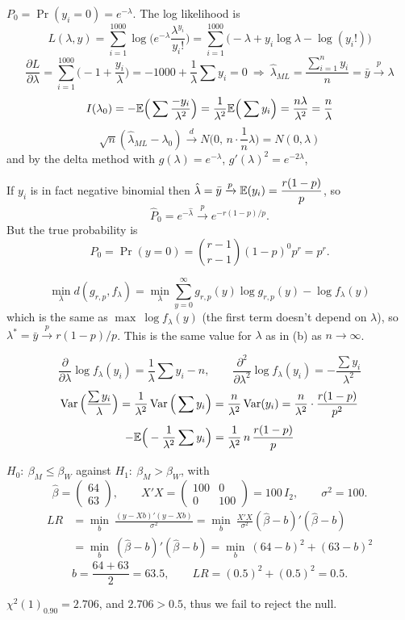 \documentclass[11pt]{article}
\begin{document}
$P_0=\Pr(y_i=0)=e^{-\lambda}$. The log likelihood is
\[
L(\lambda,y)=\sum_{i=1}^{1000}\log\Big(e^{-\lambda}\frac{\lambda^{y_i}}{y_i!}\Big)=\sum_{i=1}^{1000}\big(-\lambda+y_i\log\lambda-\log(y_i!)\big)
\]
\[
\frac{\partial L}{\partial\lambda}=\sum_{i=1}^{1000}\Big(-1+\frac{y_i}\lambda\Big)=-1000+\frac1\lambda\sum y_i=0
\ \Rightarrow\
\hat\lambda_{ML}=\frac{\sum_{i=1}^ny_i}{n}=\bar y\xrightarrow{p}\lambda
\]
\[
I(\lambda_0)=-\mathbb{E}\Big(\sum\frac{-y_i}{\lambda^2}\Big)=\frac1{\lambda^2}\mathbb{E}\Big(\sum y_i\Big)=\frac{n\lambda}{\lambda^2}=\frac n\lambda
\]
\[
\sqrt n(\hat\lambda_{ML}-\lambda_0)\xrightarrow{d}N\Big(0,\,n\cdot\frac1n\lambda\Big)=N(0,\lambda)
\]
and by the delta method with $g(\lambda)=e^{-\lambda}$, $g'(\lambda)^2=e^{-2\lambda}$,

If $y_i$ is in fact negative binomial then $\hat\lambda=\bar y\xrightarrow{p}\mathbb{E}(y_i)=\dfrac{r(1-p)}p$, so
\[
\hat P_0=e^{-\hat\lambda}\xrightarrow{p}e^{-r(1-p)/p}.
\]
But the true probability is
\[
P_0=\Pr(y=0)=\binom{r-1}{r-1}(1-p)^0p^r=p^r .
\]

\[
\min_\lambda d(g_{r,p},f_\lambda)=\min_\lambda\sum_{y=0}^\infty g_{r,p}(y)\log g_{r,p}(y)-\log f_\lambda(y)
\]
which is the same as $\max\ \log f_\lambda(y)$ (the first term doesn't depend on $\lambda$), so $\lambda^*=\bar y\xrightarrow{p}r(1-p)/p$. This is the same value for $\lambda$ as in (b) as $n\to\infty$.

\[
\frac{\partial}{\partial\lambda}\log f_\lambda(y_i)=\frac1\lambda\sum y_i-n,\qquad
\frac{\partial^2}{\partial\lambda^2}\log f_\lambda(y_i)=-\frac{\sum y_i}{\lambda^2}
\]
\[
\operatorname{Var}\Big(\frac{\sum y_i}\lambda\Big)=\frac1{\lambda^2}\operatorname{Var}\Big(\sum y_i\Big)=\frac n{\lambda^2}\operatorname{Var}(y_i)=\frac n{\lambda^2}\cdot\frac{r(1-p)}{p^2}
\]
\[
-\mathbb{E}\Big(-\frac1{\lambda^2}\sum y_i\Big)=\frac1{\lambda^2}\,n\,\frac{r(1-p)}p
\]

\newpage
{}

$H_0:\ \beta_M\le\beta_W$ against $H_1:\ \beta_M>\beta_W$, with
\[
\hat\beta=\begin{pmatrix}64\\63\end{pmatrix},\qquad X'X=\begin{pmatrix}100&0\\0&100\end{pmatrix}=100\,I_2,\qquad\sigma^2=100 .
\]
\[
\begin{aligned}
LR&=\min_b\ \frac{(y-Xb)'(y-Xb)}{\sigma^2}=\min_b\ \frac{X'X}{\sigma^2}(\hat\beta-b)'(\hat\beta-b)\\
&=\min_b\ (\hat\beta-b)'(\hat\beta-b)=\min_b\ (64-b)^2+(63-b)^2
\end{aligned}
\]
\[
b=\frac{64+63}2=63.5,\qquad LR=(0.5)^2+(0.5)^2=0.5 .
\]

$\chi^2(1)_{0.90}=2.706$, and $2.706>0.5$, thus we fail to reject the null.

\end{document}
